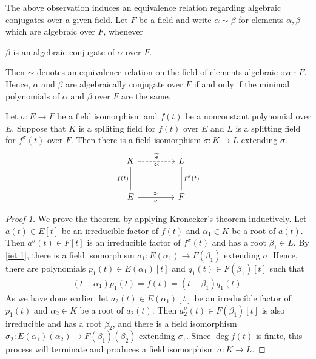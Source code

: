 \begin{rmk}
    The above observation induces an equivalence relation regarding algebraic conjugates over a given field.
    Let $F$ be a field and write $\alpha\sim\beta$ for elements $\alpha, \beta$ which are algebraic over $F$, whenever
    \begin{center}
        $\beta$ is an algebraic conjugate of $\alpha$ over $F$.
    \end{center}
    Then $\sim$ denotes an equivalence relation on the field of elements algebraic over $F$.
    Hence, $\alpha$ and $\beta$ are algebraically conjugate over $F$ if and only if the minimal polynomials of $\alpha$ and $\beta$ over $F$ are the same.
\end{rmk}

\begin{thm}\label{iet 2}
    Let $\sigma: E\rightarrow F$ be a field isomorphism and $f(t)$ be a nonconstant polynomial over $E$.
    Suppose that $K$ is a splliting field for $f(t)$ over $E$ and $L$ is a splitting field for $f^\sigma(t)$ over $F$.
    Then there is a field isomorphism $\widetilde{\sigma}: K\rightarrow L$ extending $\sigma$.
    \begin{equation*}
    \begin{tikzcd}[row sep=1.0cm, column sep=1.5cm]
        K\arrow[r, "\widetilde{\sigma}", "\approx"', dashed]
        &
        L\\
        E\arrow[u, "f(t)", dash]\arrow[r, "\approx", "\sigma"']
        &
        F\arrow[u, "f^\sigma(t)"', dash]
    \end{tikzcd}
    \end{equation*}
\end{thm}
\begin{proof}[Proof 1]
    We prove the theorem by applying Kronecker's theorem inductively.
    Let $a(t)\in E[t]$ be an irreducible factor of $f(t)$ and $\alpha_1\in K$ be a root of $a(t)$.
    Then $a^\sigma(t)\in F[t]$ is an irreducible factor of $f^\sigma(t)$ and has a root $\beta_1\in L$.
    By \cref{iet 1}, there is a field isomorphism $\sigma_1: E(\alpha_1)\rightarrow F(\beta_1)$ extending $\sigma$.
    Hence, there are polynomials $p_1(t)\in E(\alpha_1)[t]$ and $q_1(t)\in F(\beta_1)[t]$ such that
    \begin{align*}
        (t-\alpha_1)p_1(t)=f(t)=(t-\beta_1)q_1(t).
    \end{align*}
    As we have done earlier, let $a_2(t)\in E(\alpha_1)[t]$ be an irreducible factor of $p_1(t)$ and $\alpha_2\in K$ be a root of $a_2(t)$.
    Then $a_2^\sigma(t)\in F(\beta_1)[t]$ is also irreducible and has a root $\beta_2$, and there is a field isomorphism $\sigma_2: E(\alpha_1)(\alpha_2)\rightarrow F(\beta_1)(\beta_2)$ extending $\sigma_1$.
    Since $\deg f(t)$ is finite, this process will terminate and produces a field isomorphism $\widetilde{\sigma}: K\rightarrow L$.
\end{proof}
